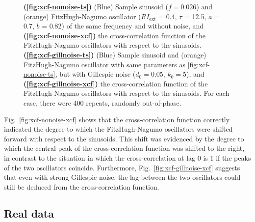 \begin{figure}
  \caption{
    \textbf{(\ref{fig:xcf-nonoise-ts})}
    (Blue) Sample sinusoid ($f = 0.026$) and (orange) FitzHugh-Nagumo oscillator ($RI_{\mathrm{ext}}$ = 0.4, $\tau$ = 12.5, $a$ = 0.7, $b$ = 0.82) of the same frequency and without noise, and
    \textbf{(\ref{fig:xcf-nonoise-xcf})}
    the cross-correlation function of the FitzHugh-Nagumo oscillators with respect to the sinusoids.
    \textbf{(\ref{fig:xcf-gillnoise-ts})}
    (Blue) Sample sinusoid and (orange) FitzHugh-Nagumo oscillator with same parameters as \ref{fig:xcf-nonoise-ts}, but with Gillespie noise ($d_{0} = 0.05$, $k_{0} = 5$), and
    \textbf{(\ref{fig:xcf-gillnoise-xcf})}
    the cross-correlation function of the FitzHugh-Nagumo oscillators with respect to the sinusoids.
    For each case, there were 400 repeats, randomly out-of-phase.
  }
  \label{fig:xcf}
\end{figure}

Fig.\ \ref{fig:xcf-nonoise-xcf} shows that the cross-correlation function correctly indicated the degree to which the FitzHugh-Nagumo oscillators were shifted forward with respect to the sinusoids.
This shift was evidenced by the degree to which the central peak of the cross-correlation function was shifted to the right, in contrast to the situation in which the cross-correlation at lag 0 is 1 if the peaks of the two oscillators coincide.
Furthermore, Fig.\ \ref{fig:xcf-gillnoise-xcf} suggests that even with strong Gillespie noise, the lag between the two oscillators could still be deduced from the cross-correlation function.


\subsection{Real data}
\label{subsubsec:analysis-correlation-real}


